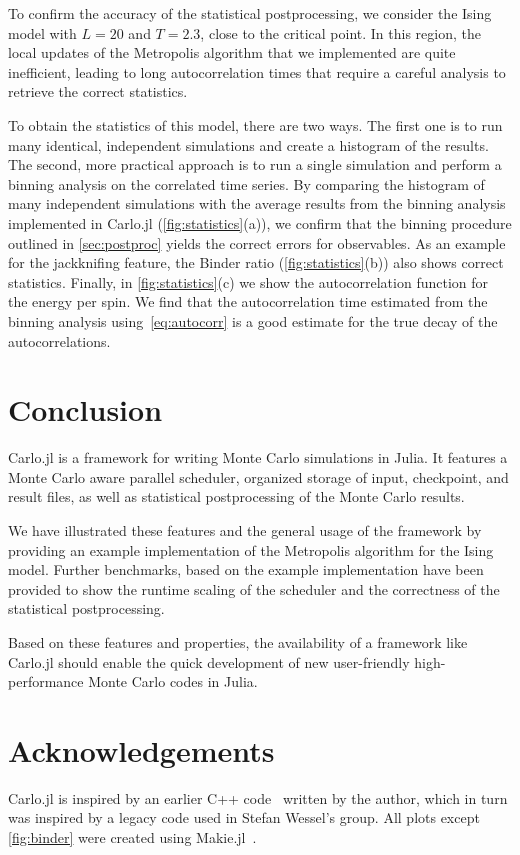 \documentclass{SciPost}
\begin{document}
To confirm the accuracy of the statistical postprocessing, we consider the Ising model with $L=20$ and $T=2.3$, close to the critical point. In this region, the local updates of the Metropolis algorithm that we implemented are quite inefficient, leading to long autocorrelation times that require a careful analysis to retrieve the correct statistics.

To obtain the statistics of this model, there are two ways. The first one is to run many identical, independent simulations and create a histogram of the results. The second, more practical approach is to run a single simulation and perform a binning analysis on the correlated time series. By comparing the histogram of many independent simulations with the average results from the binning analysis implemented in Carlo.jl (\cref{fig:statistics}(a)), we confirm that the binning procedure outlined in \cref{sec:postproc} yields the correct errors for observables. As an example for the jackknifing feature, the Binder ratio (\cref{fig:statistics}(b)) also shows correct statistics. Finally, in \cref{fig:statistics}(c) we show the autocorrelation function for the energy per spin. We find that the autocorrelation time estimated from the binning analysis using~\cref{eq:autocorr} is a good estimate for the true decay of the autocorrelations.
\section{Conclusion}
\label{sec:conclusion}
Carlo.jl is a framework for writing Monte Carlo simulations in Julia. It features a Monte Carlo aware parallel scheduler, organized storage of input, checkpoint, and result files, as well as statistical postprocessing of the Monte Carlo results.

We have illustrated these features and the general usage of the framework by providing an example implementation of the Metropolis algorithm for the Ising model. Further benchmarks, based on the example implementation have been provided to show the runtime scaling of the scheduler and the correctness of the statistical postprocessing.

Based on these features and properties, the availability of a framework like Carlo.jl should enable the quick development of new user-friendly high-performance Monte Carlo codes in Julia.
\section*{Acknowledgements}
Carlo.jl is inspired by an earlier C++ code~\cite{loadleveller} written by the author, which in turn was inspired by a legacy code used in Stefan Wessel's group.
All plots except \cref{fig:binder} were created using Makie.jl~\cite{DanischKrumbiegel2021}.
\end{document}
